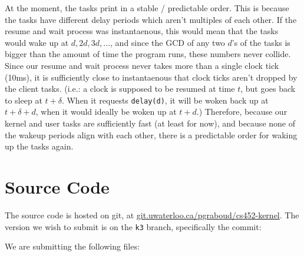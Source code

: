 \documentclass[titlepage]{article}
\begin{document}
At the moment, the tasks print in a stable / predictable order.
This is because the tasks have different delay periods which aren't multiples of each other.
If the resume and wait process was instantaenous, this would mean that the tasks would wake up at $d, 2d, 3d, \ldots$,
and since the GCD of any two $d$'s of the tasks is bigger than the amount of time the program runs, these
numbers never collide.
Since our resume and wait process never takes more than a single clock tick (10ms), it is sufficiently close to instantaenous
that clock ticks aren't dropped by the client tasks.
(i.e.: a clock is supposed to be resumed at time $t$, but goes back to sleep at $t + \delta$.
When it requests \texttt{delay(d)}, it will be woken back up at $t + \delta + d$, when it would ideally
be woken up at $t + d$.)
Therefore, because our kernel and user tasks are sufficiently fast (at least for now), and because
none of the wakeup periods align with each other, there is a predictable order for waking up the tasks again.

\section{Source Code}
The source code is hosted on git, at \url{git.uwaterloo.ca/pgraboud/cs452-kernel}.
The version we wish to submit is on the \texttt{k3} branch, specifically
the commit:

We are submitting the following files:


\end{document}
